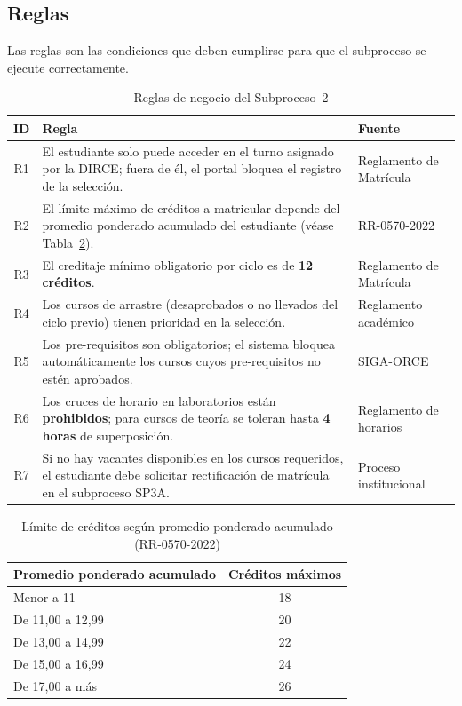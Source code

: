 \subsection{Reglas}

Las reglas son las condiciones que deben cumplirse para que el
subproceso se ejecute correctamente.

\begin{table}[H]
\centering
\caption{Reglas de negocio del Subproceso~2}
\label{tab:reglas_sp2}
\renewcommand{\arraystretch}{1.3}
\begin{tabular}{|c|p{8cm}|p{3.3cm}|}
\hline
\textbf{ID} & \textbf{Regla} & \textbf{Fuente} \\
\hline
R1 & El estudiante solo puede acceder en el turno asignado por la DIRCE;
     fuera de él, el portal bloquea el registro de la selección. &
     Reglamento de Matrícula \\
\hline
R2 & El límite máximo de créditos a matricular depende del promedio
     ponderado acumulado del estudiante (véase Tabla~\ref{tab:creditos_sp2}). &
     RR-0570-2022 \\
\hline
R3 & El creditaje mínimo obligatorio por ciclo es de \textbf{12 créditos}. &
     Reglamento de Matrícula \\
\hline
R4 & Los cursos de arrastre (desaprobados o no llevados del ciclo previo)
     tienen prioridad en la selección. &
     Reglamento académico \\
\hline
R5 & Los pre-requisitos son obligatorios; el sistema bloquea
     automáticamente los cursos cuyos pre-requisitos no estén aprobados. &
     SIGA-ORCE \\
\hline
R6 & Los cruces de horario en laboratorios están \textbf{prohibidos};
     para cursos de teoría se toleran hasta \textbf{4 horas} de superposición. &
     Reglamento de horarios \\
\hline
R7 & Si no hay vacantes disponibles en los cursos requeridos, el
     estudiante debe solicitar rectificación de matrícula en el
     subproceso SP3A. &
     Proceso institucional \\
\hline
\end{tabular}
\end{table}

\begin{table}[H]
\centering
\caption{Límite de créditos según promedio ponderado acumulado (RR-0570-2022)}
\label{tab:creditos_sp2}
\renewcommand{\arraystretch}{1.3}
\begin{tabular}{|p{6cm}|c|}
\hline
\textbf{Promedio ponderado acumulado} & \textbf{Créditos máximos} \\
\hline
Menor a 11            & 18 \\
\hline
De 11,00 a 12,99      & 20 \\
\hline
De 13,00 a 14,99      & 22 \\
\hline
De 15,00 a 16,99      & 24 \\
\hline
De 17,00 a más        & 26 \\
\hline
\end{tabular}
\end{table}

